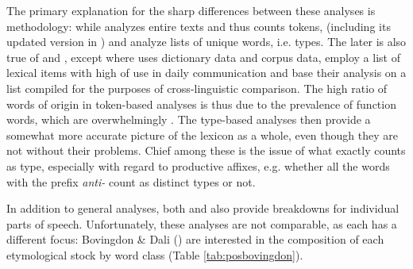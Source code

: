 \documentclass[output=paper]{langsci/langscibook}
\begin{document}
The primary explanation for the sharp differences between these analyses is methodology: while \cite{fenech1978} analyzes entire texts and thus counts tokens, \cite{brincat1996} (including its updated version in \citealt{brincat2011}) and \cite{bovingdondalli2006} analyze lists of unique words, i.e. types. The later is also true of \cite{mifsudborg1997} and \cite{comriespagnol2016}, except where \cite{brincat1996} uses dictionary data and \cite{bovingdondalli2006} corpus data, \cite{mifsudborg1997} employ a list of lexical items with high  of use in daily communication and \cite{comriespagnol2016} base their analysis on a list compiled for the purposes of cross-linguistic comparison. The high ratio of words of  origin in token-based analyses is thus due to the prevalence of function words, which are overwhelmingly . The type-based analyses then provide a somewhat more accurate picture of the lexicon as a whole, even though they are not without their problems. Chief among these is the issue of what exactly counts as type, especially with regard to productive  affixes, e.g. whether all the words with the prefix \textit{anti-} count as distinct types or not.


In addition to general analyses, both \cite{bovingdondalli2006} and \cite{comriespagnol2016} also provide breakdowns for individual parts of speech. Unfortunately, these analyses are not comparable, as each has a different focus: Bovingdon \& Dali (\citeyear[71]{bovingdondalli2006}) are interested in the composition of each etymological stock by word class (Table \ref{tab:posbovingdon}).
\end{document}
